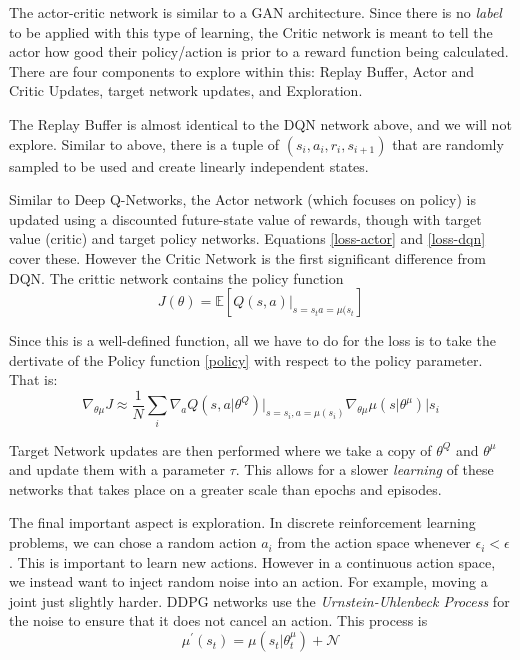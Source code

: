 \documentclass[doc, onecolumn, 12pt]{apa6}
\begin{document}
The actor-critic network is similar to a GAN architecture. Since there is no \emph{label} to be applied with this type of learning, the Critic network is meant to tell the actor how good their policy/action is prior to a reward function being calculated. There are four components to explore within this: Replay Buffer, Actor and Critic Updates, target network updates, and Exploration. 

The Replay Buffer is almost identical to the DQN network above, and we will not explore. Similar to above, there is a tuple of $(s_{i}, a_{i}, r_{i}, s_{i+1})$ that are randomly sampled to be used and create linearly independent states.

Similar to Deep Q-Networks, the Actor network (which focuses on policy) is updated using a discounted future-state value of rewards, though with target value (critic) and target policy networks. Equations \ref{loss-actor} and \ref{loss-dqn} cover these.  However the Critic Network is the first significant difference from DQN. The crittic network contains the policy function \begin{equation} \label{policy} 
J(\theta) = \mathbb{E}  \left[ Q(s,a) \vert_{s=s_{t}a=\mu(s_{t}} \right]
\end{equation} 

Since this is a well-defined function, all we have to do for the loss is to take the dertivate of the Policy function  \ref{policy} with respect to the policy parameter. That is:  \begin{equation} \label{polderiv}  \nabla_{\theta \mu} J \approx \frac{1}{N} \sum_{i} \nabla_{a} Q(s, a \vert \theta^{Q}) \vert_{s=s_{i}, a = \mu (s_{i})}  \nabla_{\theta\mu} \mu(s \vert \theta ^{\mu}) \vert s_{i} \end{equation}

Target Network updates are then performed where we take a copy of $\theta^{Q}$ and $\theta^{\mu}$ and update them with a parameter $\tau$. This allows for a slower \emph{learning} of these networks that takes place on a greater scale than epochs and episodes. 

The final important aspect is exploration. In discrete reinforcement learning problems, we can chose a random action $a_{i}$ from the action space whenever $\epsilon_{i} < \epsilon$. This is important to learn new actions. However in a continuous action space, we instead want to inject random noise into an action. For example, moving a joint just slightly harder. DDPG networks use the \emph{Urnstein-Uhlenbeck Process} for the noise to ensure that it does not cancel an action. This process is \[ \mu ^{\prime}(s_{t}) = \mu( s_{t} \vert \theta^{\mu}_{t}) + \mathcal{N}\]
\end{document}
